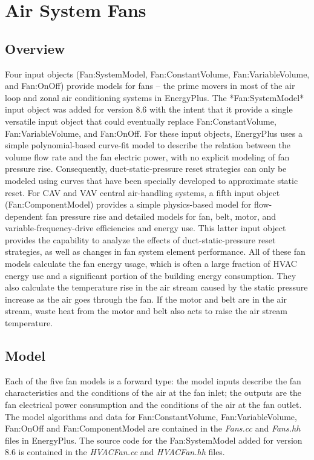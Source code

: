 \section{Air System Fans }\label{air-system-fans}

\subsection{Overview}\label{overview-002}

Four input objects (Fan:SystemModel, Fan:ConstantVolume, Fan:VariableVolume, and Fan:OnOff) provide models for fans -- the prime movers in most of the air loop and zonal air conditioning systems in EnergyPlus. The *Fan:SystemModel* input object was added for version 8.6 with the intent that it provide a single versatile input object that could eventually replace Fan:ConstantVolume, Fan:VariableVolume, and Fan:OnOff. For these input objects, EnergyPlus uses a simple polynomial-based curve-fit model to describe the relation between the volume flow rate and the fan electric power, with no explicit modeling of fan pressure rise. Consequently, duct-static-pressure reset strategies can only be modeled using curves that have been specially developed to approximate static reset.  For CAV and VAV central air-handling systems, a fifth input object (Fan:ComponentModel) provides a simple physics-based model for flow-dependent fan pressure rise and detailed models for fan, belt, motor, and variable-frequency-drive efficiencies and energy use. This latter input object provides the capability to analyze the effects of duct-static-pressure reset strategies, as well as changes in fan system element performance. All of these fan models calculate the fan energy usage, which is often a large fraction of HVAC energy use and a significant portion of the building energy consumption. They also calculate the temperature rise in the air stream caused by the static pressure increase as the air goes through the fan. If the motor and belt are in the air stream, waste heat from the motor and belt also acts to raise the air stream temperature.

\subsection{Model}\label{model-000}

Each of the five fan models is a forward type: the model inputs describe the fan characteristics and the conditions of the air at the fan inlet; the outputs are the fan electrical power consumption and the conditions of the air at the fan outlet. The model algorithms and data for Fan:ConstantVolume, Fan:VariableVolume, Fan:OnOff and Fan:ComponentModel are contained in the \emph{Fans.cc} and \emph{Fans.hh} files in EnergyPlus.  The source code for the Fan:SystemModel added for version 8.6 is contained in the \emph{HVACFan.cc} and \emph{HVACFan.hh} files.

